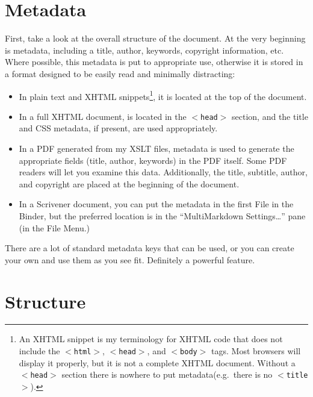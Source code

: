 \documentclass[oneside,article]{memoir}
\begin{document}
\section{Metadata}
\label{metadata}

First, take a look at the overall structure of the document. At the very
beginning is metadata, including a title, author, keywords, copyright
information, etc. Where possible, this metadata is put to appropriate use,
otherwise it is stored in a format designed to be easily read and minimally
distracting:


\begin{itemize}


\item In plain text and XHTML snippets\footnote{An XHTML snippet is my terminology for XHTML code that does not
include the \texttt{$<$html$>$}, \texttt{$<$head$>$}, and \texttt{$<$body$>$} tags. Most browsers will display
it properly, but it is not a complete XHTML document. Without a \texttt{$<$head$>$}
section there is nowhere to put metadata(e.g.\ there is no \texttt{$<$title$>$}).}, it is located at the top of the
document.




\item In a full XHTML document, is located in the \texttt{$<$head$>$} section, and the title
and CSS metadata, if present, are used appropriately.




\item In a PDF generated from my XSLT files, metadata is used to generate the
appropriate fields (title, author, keywords) in the PDF itself. Some PDF
readers will let you examine this data. Additionally, the title, subtitle,
author, and copyright are placed at the beginning of the document.




\item In a Scrivener document, you can put the metadata in the first File in the
Binder, but the preferred location is in the ``MultiMarkdown Settings{\ldots}''
pane (in the File Menu.)



\end{itemize}

There are a lot of standard metadata keys that can be used, or you can create
your own and use them as you see fit. Definitely a powerful feature.


\section{Structure}
\label{structure}
\end{document}
